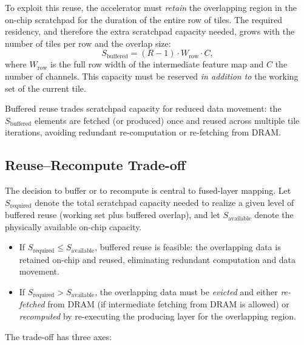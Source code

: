 To exploit this reuse, the accelerator must \emph{retain} the
overlapping region in the on-chip scratchpad for the duration of
the entire row of tiles.
The required residency, and therefore the extra scratchpad capacity
needed, grows with the number of tiles per row and the overlap
size:
%
\begin{equation}
\label{eq:buffered-reuse-size}
S_{\text{buffered}} = (R - 1) \cdot W_{\text{row}} \cdot C,
\end{equation}
%
where $W_{\text{row}}$ is the full row width of the intermediate
feature map and $C$ the number of channels.
This capacity must be reserved \emph{in addition to} the working
set of the current tile.

Buffered reuse trades scratchpad capacity for reduced data movement:
the $S_{\text{buffered}}$ elements are fetched (or produced) once
and reused across multiple tile iterations, avoiding redundant
re-computation or re-fetching from DRAM.


\subsection{Reuse--Recompute Trade-off}
\label{sec:fds-reuse-recompute}

The decision to buffer or to recompute is central to fused-layer
mapping.
Let $S_{\text{required}}$ denote the total scratchpad capacity
needed to realize a given level of buffered reuse (working set plus
buffered overlap), and let $S_{\text{available}}$ denote the
physically available on-chip capacity.

\begin{itemize}
  \item If $S_{\text{required}} \le S_{\text{available}}$, buffered
        reuse is feasible: the overlapping data is retained on-chip
        and reused, eliminating redundant computation and data
        movement.
  \item If $S_{\text{required}} > S_{\text{available}}$, the
        overlapping data must be \emph{evicted} and either
        \emph{re-fetched} from DRAM (if intermediate fetching from DRAM is
        allowed) or \emph{recomputed} by re-executing the producing
        layer for the overlapping region.
\end{itemize}

The trade-off has three axes:

